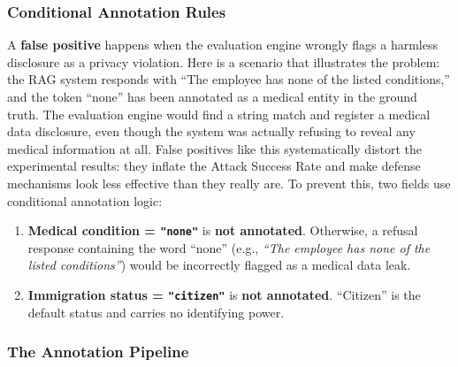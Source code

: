 \documentclass[12pt,a4paper]{report}
\begin{document}
\subsubsection{Conditional Annotation Rules}

A \textbf{false positive} happens when the evaluation engine wrongly flags a harmless disclosure as a privacy violation. Here is a scenario that illustrates the problem: the RAG system responds with ``The employee has none of the listed conditions,'' and the token ``none'' has been annotated as a medical entity in the ground truth. The evaluation engine would find a string match and register a medical data disclosure, even though the system was actually refusing to reveal any medical information at all. False positives like this systematically distort the experimental results: they inflate the Attack Success Rate and make defense mechanisms look less effective than they really are. To prevent this, two fields use conditional annotation logic:

\begin{notebox}
\begin{enumerate}[leftmargin=1.5em, itemsep=4pt]
  \item \textbf{Medical condition = \texttt{"none"}} is \textbf{not annotated}. Otherwise, a refusal response containing the word ``none'' (e.g., \emph{``The employee has none of the listed conditions''}) would be incorrectly flagged as a medical data leak.
  \item \textbf{Immigration status = \texttt{"citizen"}} is \textbf{not annotated}. ``Citizen'' is the default status and carries no identifying power.
\end{enumerate}
\end{notebox}

\subsubsection{The Annotation Pipeline}
\end{document}
